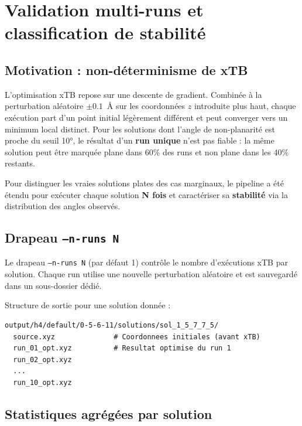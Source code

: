 \section{Validation multi-runs et classification de stabilité}


\subsection{Motivation : non-déterminisme de xTB}

L'optimisation xTB repose sur une descente de gradient. Combinée à la perturbation aléatoire
$\pm 0.1$~\AA{} sur les coordonnées $z$ introduite plus haut, chaque exécution part d'un point
initial légèrement différent et peut converger vers un minimum local distinct. Pour les solutions dont l'angle de non-planarité est proche du seuil 10°, le
résultat d'un \textbf{run unique} n'est pas fiable : la même solution peut être marquée plane
dans 60\% des runs et non plane dans les 40\% restants.

Pour distinguer les vraies solutions plates des cas marginaux, le pipeline a été étendu pour
exécuter chaque solution \textbf{N fois} et caractériser sa \textbf{stabilité} via la
distribution des angles observés.

\subsection{Drapeau \texttt{--n-runs N}}

Le drapeau \texttt{--n-runs N} (par défaut 1) contrôle le nombre d'exécutions xTB par
solution. Chaque run utilise une nouvelle perturbation aléatoire et est sauvegardé dans un
sous-dossier dédié.

Structure de sortie pour une solution donnée :

\begin{lstlisting}[style=benzai]
output/h4/default/0-5-6-11/solutions/sol_1_5_7_7_5/
  source.xyz              # Coordonnees initiales (avant xTB)
  run_01_opt.xyz          # Resultat optimise du run 1
  run_02_opt.xyz
  ...
  run_10_opt.xyz
\end{lstlisting}

\subsection{Statistiques agrégées par solution}

